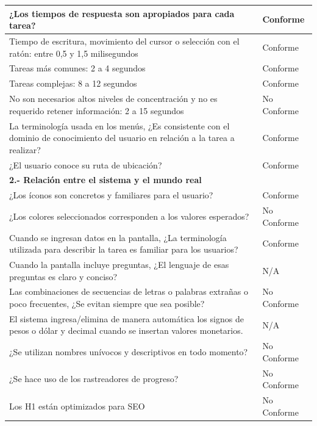 \documentclass[stu, 12pt, letterpaper, donotrepeattitle, floatsintext, natbib]{apa7}
\begin{document}
\begin{longtable}{|>{\raggedright\arraybackslash}p{10cm}|>{\centering\arraybackslash}p{3cm}|}
    ¿Los tiempos de respuesta son apropiados para cada tarea? & Conforme \\ \hline
    Tiempo de escritura, movimiento del cursor o selección con el ratón: entre 0,5 y 1,5 milisegundos & Conforme \\ \hline
    Tareas más comunes: 2 a 4 segundos & Conforme \\ \hline
    Tareas complejas: 8 a 12 segundos & Conforme \\ \hline
    No son necesarios altos niveles de concentración y no es requerido retener información: 2 a 15 segundos & No Conforme\\ \hline
    La terminología usada en los menús, ¿Es consistente con el dominio de conocimiento del usuario en relación a la tarea a realizar? & Conforme \\ \hline
    ¿El usuario conoce su ruta de ubicación? & Conforme \\ \hline
    
    \textbf{2.- Relación entre el sistema y el mundo real} & \\ \hline
    ¿Los íconos son concretos y familiares para el usuario? & Conforme \\ \hline
    ¿Los colores seleccionados corresponden a los valores esperados? & No Conforme \\ \hline
    Cuando se ingresan datos en la pantalla, ¿La terminología utilizada para describir la tarea es familiar para los usuarios? & Conforme \\ \hline
    Cuando la pantalla incluye preguntas, ¿El lenguaje de esas preguntas es claro y conciso? & N/A \\ \hline
    Las combinaciones de secuencias de letras o palabras extrañas o poco frecuentes, ¿Se evitan siempre que sea posible? & No Conforme\\ \hline
    El sistema ingresa/elimina de manera automática los signos de pesos o dólar y decimal cuando se insertan valores monetarios. & N/A\\ \hline
    ¿Se utilizan nombres unívocos y descriptivos en todo momento? & No Conforme \\ \hline
    ¿Se hace uso de los rastreadores de progreso? & No Conforme\\ \hline
    Los H1 están optimizados para SEO & No Conforme \\ \hline
    

\end{longtable}
\end{document}
